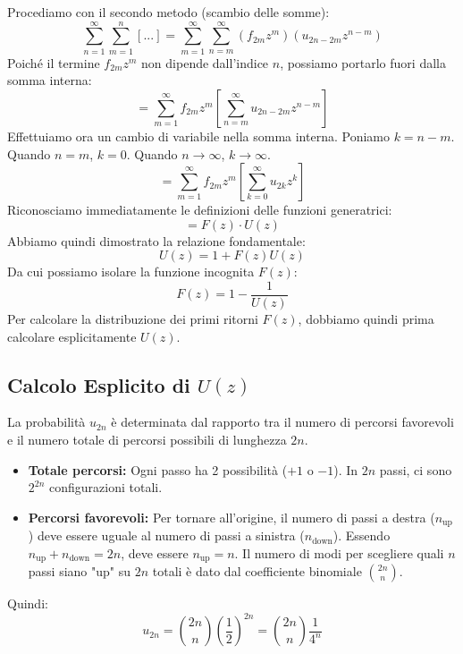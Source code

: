 Procediamo con il secondo metodo (scambio delle somme):
\begin{equation}
    \sum_{n=1}^{\infty} \sum_{m=1}^{n} [...] = \sum_{m=1}^{\infty} \sum_{n=m}^{\infty} (f_{2m} z^m) (u_{2n-2m} z^{n-m})
\end{equation}
Poiché il termine $f_{2m} z^m$ non dipende dall'indice $n$, possiamo portarlo fuori dalla somma interna:
\begin{equation}
    = \sum_{m=1}^{\infty} f_{2m} z^m \left[ \sum_{n=m}^{\infty} u_{2n-2m} z^{n-m} \right]
\end{equation}
Effettuiamo ora un cambio di variabile nella somma interna. Poniamo $k = n - m$.
Quando $n=m$, $k=0$. Quando $n \to \infty$, $k \to \infty$.
\begin{equation}
    = \sum_{m=1}^{\infty} f_{2m} z^m \left[ \sum_{k=0}^{\infty} u_{2k} z^k \right]
\end{equation}
Riconosciamo immediatamente le definizioni delle funzioni generatrici:
\begin{equation}
    = F(z) \cdot U(z)
\end{equation}
Abbiamo quindi dimostrato la relazione fondamentale:
\begin{equation}
    U(z) = 1 + F(z)U(z)
\end{equation}
Da cui possiamo isolare la funzione incognita $F(z)$:
\begin{equation} \label{eq:F_from_U}
    F(z) = 1 - \frac{1}{U(z)}
\end{equation}
Per calcolare la distribuzione dei primi ritorni $F(z)$, dobbiamo quindi prima calcolare esplicitamente $U(z)$.

\subsection{Calcolo Esplicito di $U(z)$}

La probabilità $u_{2n}$ è determinata dal rapporto tra il numero di percorsi favorevoli e il numero totale di percorsi possibili di lunghezza $2n$.
\begin{itemize}
    \item \textbf{Totale percorsi:} Ogni passo ha 2 possibilità ($+1$ o $-1$). In $2n$ passi, ci sono $2^{2n}$ configurazioni totali.
    \item \textbf{Percorsi favorevoli:} Per tornare all'origine, il numero di passi a destra ($n_{\text{up}}$) deve essere uguale al numero di passi a sinistra ($n_{\text{down}}$). Essendo $n_{\text{up}} + n_{\text{down}} = 2n$, deve essere $n_{\text{up}} = n$.
    Il numero di modi per scegliere quali $n$ passi siano "up" su $2n$ totali è dato dal coefficiente binomiale $\binom{2n}{n}$.
\end{itemize}
Quindi:
\begin{equation}
    u_{2n} = \binom{2n}{n} \left(\frac{1}{2}\right)^{2n} = \binom{2n}{n} \frac{1}{4^n}
\end{equation}

